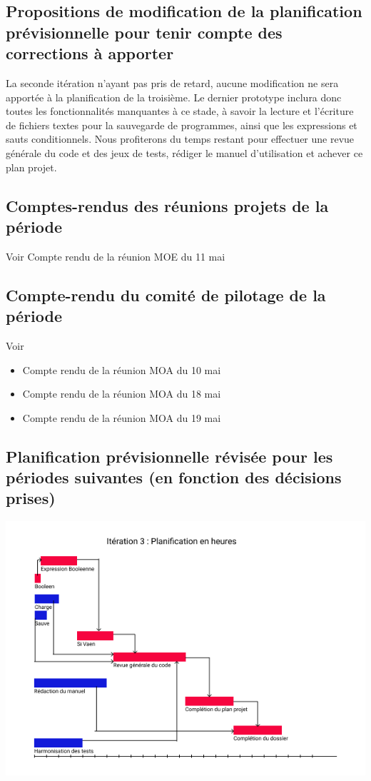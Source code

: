 \documentclass[12pt,a4paper,titlepage,openany, oneside]{report}
\begin{document}
    \subsection{Propositions de modification de la planification prévisionnelle pour tenir compte des corrections à apporter}
        La seconde itération n'ayant pas pris de retard, aucune modification ne sera
        apportée à la planification de la troisième. Le dernier prototype inclura donc
        toutes les fonctionnalités manquantes à ce stade, à savoir la lecture et l'écriture
        de fichiers textes pour la sauvegarde de programmes, ainsi que les expressions
        et sauts conditionnels. Nous profiterons du temps restant pour effectuer une
        revue générale du code et des jeux de tests, rédiger le manuel d'utilisation et
        achever ce plan projet.

    \subsection{Comptes-rendus des réunions projets de la période}
        Voir Compte rendu de la réunion MOE du 11 mai
    \subsection{Compte-rendu du comité de pilotage de la période}
        Voir
        \begin{itemize}
            \item Compte rendu de la réunion MOA du 10 mai
            \item Compte rendu de la réunion MOA du 18 mai
            \item Compte rendu de la réunion MOA du 19 mai
        \end{itemize}


    \subsection{Planification prévisionnelle révisée pour les périodes suivantes (en fonction des décisions prises)}

    \includegraphics[scale=0.75]{fichiers/planification/iteration3/iteration3Planif.png}
\end{document}
